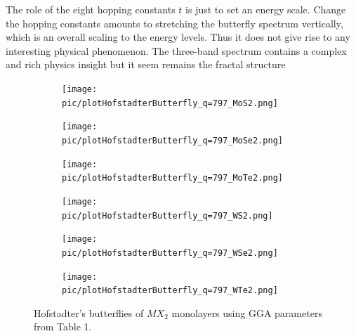 \documentclass{report}
\begin{document}
The role of the eight hopping constants $t$ is just to set an energy scale. Change the hopping constants amounts to stretching the butterfly spectrum vertically, which is an overall scaling to the energy levels. Thus it does not give rise to any interesting physical phenomenon. The three-band spectrum contains a complex and rich physics insight but it seem remains the fractal structure
\begin{figure}[htb]
	\centering
	\begin{subfigure}[b]{0.32\linewidth}
		\centering
		\texttt{[image: pic/plotHofstadterButterfly\_q=797\_MoS2.png]}
		\label{fig:matt 1}
	\end{subfigure}
	\begin{subfigure}[b]{0.32\linewidth}
		\centering
		\texttt{[image: pic/plotHofstadterButterfly\_q=797\_MoSe2.png]}
		\label{fig:matt 2}
	\end{subfigure}
	\begin{subfigure}[b]{0.32\linewidth}
		\centering
		\texttt{[image: pic/plotHofstadterButterfly\_q=797\_MoTe2.png]}
		\label{fig:matt 3}
	\end{subfigure}
	\begin{subfigure}[b]{0.32\linewidth}
		\centering
		\texttt{[image: pic/plotHofstadterButterfly\_q=797\_WS2.png]}
		\label{fig:matt 4}
	\end{subfigure}
	\begin{subfigure}[b]{0.32\linewidth}
		\centering
		\texttt{[image: pic/plotHofstadterButterfly\_q=797\_WSe2.png]}
		\label{fig:matt 5}
	\end{subfigure}
	\begin{subfigure}[b]{0.32\linewidth}
		\centering
		\texttt{[image: pic/plotHofstadterButterfly\_q=797\_WTe2.png]}
		\label{fig:matt 6}
	\end{subfigure}
	\caption[Showcase Hofstadter’s butterflies of $MX_{2}$ monolayers.]{
		Hofstadter’s butterflies of $MX_{2}$ monolayers using GGA parameters from Table 1.
	}
\end{figure}


\end{document}
